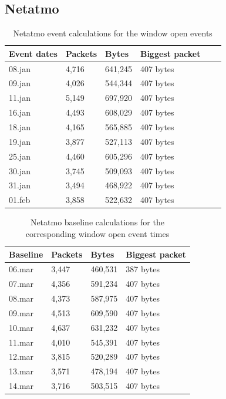 \newpage
\subsection{Netatmo}

\begin{table}[H]
    \centering
    \caption{Netatmo event calculations for the window open events}
    \begin{tabular}{|l|l|l|l|l|l|}
    \hline
        \textbf{Event dates} & \textbf{Packets} & \textbf{Bytes} & \textbf{Biggest packet} \\ \hline
        08.jan & 4,716 & 641,245 & 407 bytes\\ \hline
        09.jan & 4,026 & 544,344 & 407 bytes \\ \hline
        11.jan & 5,149 & 697,920 & 407 bytes\\ \hline
        16.jan & 4,493 & 608,029 & 407 bytes\\ \hline
        18.jan & 4,165 & 565,885 & 407 bytes\\ \hline
        19.jan & 3,877 & 527,113 & 407 bytes \\ \hline
        25.jan & 4,460 & 605,296 & 407 bytes \\ \hline
        30.jan & 3,745 & 509,093 & 407 bytes \\ \hline
        31.jan & 3,494 & 468,922 & 407 bytes \\ \hline
        01.feb & 3,858 & 522,632 & 407 bytes \\ \hline
    \end{tabular}
    \label{tab:NetatmoWindowCalculations}
\end{table}

\begin{table}[H]
    \centering
    \caption{Netatmo baseline calculations for the corresponding window open event times}
    \begin{tabular}{|l|l|l|l|}
    \hline
        \textbf{Baseline} & \textbf{Packets} & \textbf{Bytes} & \textbf{Biggest packet} \\ \hline
        06.mar & 3,447 & 460,531 & 387 bytes\\ \hline
        07.mar & 4,356 & 591,234 & 407 bytes\\ \hline
        08.mar & 4,373 & 587,975 & 407 bytes \\ \hline
        09.mar & 4,513 & 609,590 & 407 bytes \\ \hline
        10.mar & 4,637 & 631,232 & 407 bytes \\ \hline
        11.mar & 4,010 & 545,391 & 407 bytes \\ \hline
        12.mar & 3,815 & 520,289 & 407 bytes \\ \hline
        13.mar & 3,571 & 478,194 & 407 bytes \\ \hline
        14.mar & 3,716 & 503,515 & 407 bytes \\ \hline
    \end{tabular}
    \label{tab:NetatmoBaselineWindowCalculations}
\end{table}

